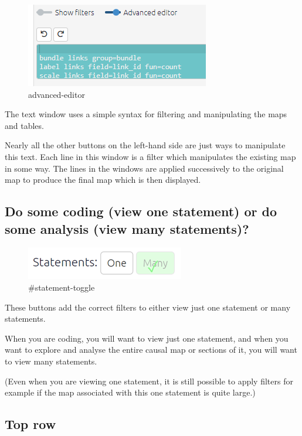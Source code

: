 \documentclass[
]{book}
\begin{document}
\begin{figure}
\centering
\includegraphics{_assets/image-20210914103354673.png}
\caption{advanced-editor}
\end{figure}

The text window uses a simple syntax for filtering and manipulating the maps and tables.

Nearly all the other buttons on the left-hand side are just ways to manipulate this text. Each line in this window is a filter which manipulates the existing map in some way. The lines in the windows are applied successively to the original map to produce the final map which is then displayed.

\hypertarget{xstatement-view}{%
\subsection{Do some coding (view one statement) or do some analysis (view many statements)?}\label{xstatement-view}}

\begin{figure}
\centering
\includegraphics{_assets/image-20211026110623336.png}
\caption{\#statement-toggle}
\end{figure}

These buttons add the correct filters to either view just one statement or many statements.

When you are coding, you will want to view just one statement, and when you want to explore and analyse the entire causal map or sections of it, you will want to view many statements.

(Even when you are viewing one statement, it is still possible to apply filters for example if the map associated with this one statement is quite large.)

\hypertarget{top-row}{%
\subsection{Top row}\label{top-row}}
\end{document}
